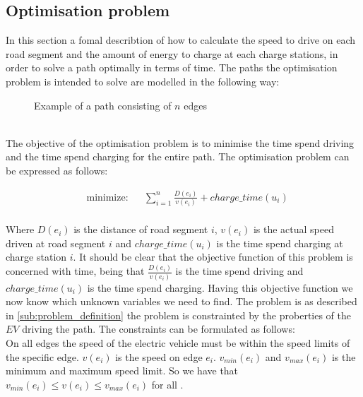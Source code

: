 \subsection{Optimisation problem}
In this section a fomal describtion of how to calculate the speed to drive on each road segment and the amount of energy to charge at each charge stations, in order to solve a path optimally in terms of time. The paths the optimisation problem is intended to solve are modelled in the following way: \\
\begin{figure}[h!]
\centering
    \caption{Example of a path consisting of $n$ edges} \label{fig:pathexample}
\end{figure} \\

The objective of the optimisation problem is to minimise the time spend driving 
and the time spend charging for the entire path. The optimisation problem can be expressed as follows:

\begin{equation}
	\begin{aligned} & 
	{\text{minimize:}}
	& & \sum_{i=1}^{n} \frac{D(e_i)}{v(e_i)} + charge\_time(u_i) \\
	\end{aligned}
\end{equation}\label{eq:objfunction}

Where $D(e_i)$ is the distance of road segment $i$, $v(e_i)$ is the actual speed driven at road segment $i$ and $charge\_time(u_i)$ is the time spend charging at charge station $i$. It should be clear that the objective function of this problem is concerned with time, being that $\frac{D(e_i)}{v(e_i)}$ is the time spend driving and $charge\_time(u_i)$ is the time spend charging. Having this objective function we now know which unknown variables we need to find. The problem is as described in \cref{sub:problem_definition} the problem is constrainted by the proberties of the $EV$ driving the path.  
The constraints can be formulated as follows: \\
On all edges the speed of the electric vehicle must be within the speed limits of the specific edge. $v(e_i)$ is the speed on edge $e_i$. $v_{min}(e_i)$ and $v_{max}(e_i)$ is the minimum and maximum speed limit. So we have that $v_{min}(e_i) \leq v(e_i) \leq v_{max}(e_i)$ for all .
 
